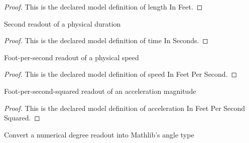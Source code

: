\begin{proof}
  This is the declared model definition of length In Feet.
\end{proof}
\begin{definition}
  \label{def:physics:phyx-mini-0751:phyxminiproblems-problemphyxmini0751-timeinseconds}
  Second readout of a physical duration
\end{definition}
\begin{proof}
  This is the declared model definition of time In Seconds.
\end{proof}
\begin{definition}
  \label{def:physics:phyx-mini-0751:phyxminiproblems-problemphyxmini0751-speedinfeetpersecond}
  Foot-per-second readout of a physical speed
\end{definition}
\begin{proof}
  This is the declared model definition of speed In Feet Per Second.
\end{proof}
\begin{definition}
  \label{def:physics:phyx-mini-0751:phyxminiproblems-problemphyxmini0751-accelerationinfeetpersecondsquared}
  Foot-per-second-squared readout of an acceleration magnitude
\end{definition}
\begin{proof}
  This is the declared model definition of acceleration In Feet Per Second Squared.
\end{proof}
\begin{definition}[degrees]
  \label{def:physics:phyx-mini-0751:phyxminiproblems-problemphyxmini0751-degrees}
  Convert a numerical degree readout into Mathlib's angle type
\end{definition}
